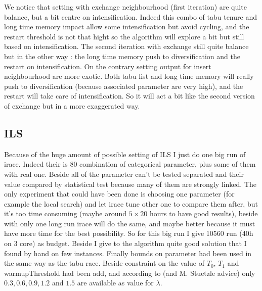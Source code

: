 \documentclass[12pt,a4paper]{article}
\begin{document}
We notice that setting with exchange neighbourhood (first iteration) are quite balance, but a bit centre on intensification. Indeed this combo of tabu tenure and long time memory impact allow some intensification but avoid cycling, and the restart threshold is not that hight so the algorithm will explore a bit but still based on intensification. The second iteration with exchange still quite balance but in the other way : the long time memory push to diversification and the restart on intensification. On the contrary setting output for insert neighbourhood are more exotic. Both tabu list and long time memory will really push to diversification (because associated parameter are very high), and the restart will take care of intensification. So it will act a bit like the second version of exchange but in a more exaggerated way.

\subsection{ILS}

Because of the huge amount of possible setting of ILS I just do one big run of irace. Indeed their is 80 combination of categorical parameter, plus some of them with real one. Beside all of the parameter can't be tested separated and their value compared by statistical test because many of them are strongly linked. The only experiment that could have been done is choosing one parameter (for example the local search) and let irace tune other one to compare them after, but it's too time consuming (maybe around $5 \times 20$ hours to have good results), beside with only one long run irace will do the same, and maybe better because it must have more time for the best possibility. So for this big run I give 10560 run (40h on 3 core) as budget. Beside I give to the algorithm quite good solution that I found by hand on few instances. Finally bounds on parameter had been used in the same way as the tabu race. Beside constraint on the value of $T_0$, $T_1$ and warmupThreshold had been add, and according to \cite{Ruiz06asimple} (and M. Stuetzle advice) only $0.3, 0.6, 0.9, 1.2 \text{ and } 1.5$ are available as value for $\lambda$.\\
\end{document}
